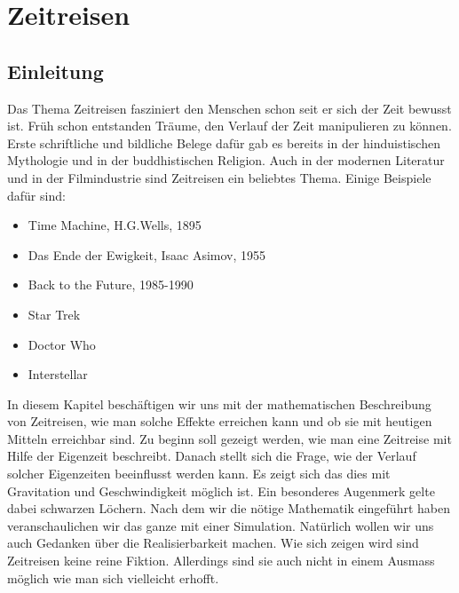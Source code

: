 \chapter{Zeitreisen\label{chapter:thema}}
\begin{refsection}
\section{Einleitung}
Das Thema Zeitreisen fasziniert den Menschen schon seit er sich der Zeit bewusst ist. Früh schon entstanden Träume, den Verlauf der Zeit manipulieren zu können. Erste schriftliche und bildliche Belege dafür gab es bereits in der hinduistischen Mythologie und in der buddhistischen Religion. Auch in der modernen Literatur und in der Filmindustrie sind Zeitreisen ein beliebtes Thema. Einige Beispiele daf\"ur sind: 
\begin{itemize}
    \item Time Machine, H.G.Wells, 1895 
    \item Das Ende der Ewigkeit, Isaac Asimov, 1955
    \item Back to the Future, 1985-1990
    \item Star Trek
    \item Doctor Who
    \item Interstellar

\end{itemize}
In diesem Kapitel beschäftigen wir uns mit der mathematischen Beschreibung von Zeitreisen, wie man solche Effekte erreichen kann und ob sie mit heutigen Mitteln erreichbar sind. Zu beginn soll gezeigt werden, wie man eine Zeitreise mit Hilfe der Eigenzeit beschreibt. Danach stellt sich die Frage, wie der Verlauf solcher Eigenzeiten beeinflusst werden kann. Es zeigt sich das dies mit Gravitation und Geschwindigkeit möglich ist. Ein besonderes Augenmerk gelte dabei schwarzen Löchern. Nach dem wir die nötige Mathematik eingeführt haben veranschaulichen wir das ganze mit einer Simulation. Natürlich wollen wir uns auch Gedanken über die Realisierbarkeit machen. Wie sich zeigen wird sind Zeitreisen keine reine Fiktion. Allerdings sind sie auch nicht in einem Ausmass möglich wie man sich vielleicht erhofft.

\end{refsection}
